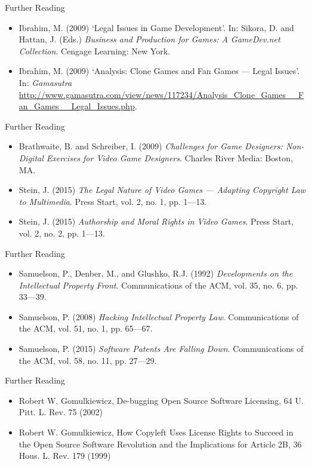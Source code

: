 \documentclass[xcolor={dvipsnames}]{beamer}\usepackage{etoolbox}\newtoggle{printable}\togglefalse{printable}
\begin{document}
\begin{frame}{Further Reading}
	\begin{itemize}
		\item Ibrahim, M. (2009) `Legal Issues in Game Development'. In: Sikora, D. and Hattan, J. (Eds.) \textit{Business and Production for Games: A GameDev.net Collection}.
		Cengage Learning: New York.
		\vspace{2ex}
		\item Ibrahim, M. (2009) `Analysis: Clone Games and Fan Games --- Legal Issues'. In: \textit{Gamasutra}
		\url{http://www.gamasutra.com/view/news/117234/Analysis_Clone_Games__Fan_Games__Legal_Issues.php}.
	\end{itemize}
\end{frame}

\begin{frame}{Further Reading}
	\begin{itemize}
		\item Brathwaite, B. and Schreiber, I. (2009) \textit{Challenges for Game Designers: Non-Digital Exercises for Video Game Designers}. Charles
		River Media: Boston, MA.
		\vspace{2ex}
		\item Stein, J. (2015) \textit{The Legal Nature of Video Games --- Adapting Copyright Law to Multimedia}. Press Start, vol. 2, no. 1, pp. 1---13.
		\vspace{2ex}
		\item Stein, J. (2015) \textit{Authorship and Moral Rights in Video Games}. Press Start, vol. 2, no. 2, pp. 1---13.
	\end{itemize}
\end{frame}

\begin{frame}{Further Reading}
	\begin{itemize}
		\item Samuelson, P., Denber, M., and Glushko, R.J. (1992) \textit{Developments on the Intellectual Property Front}. Communications of the ACM, vol. 35, no. 6, pp. 33---39.
		\item Samuelson, P. (2008) \textit{Hacking Intellectual Property Law}. Communications of the ACM, vol. 51, no. 1, pp. 65---67.
		\item Samuelson, P. (2015) \textit{Software Patents Are Falling Down}. Communications of the ACM, vol. 58, no. 11, pp. 27---29.
	\end{itemize}
\end{frame}

\begin{frame}{Further Reading}
	\begin{itemize}
		\item Robert W. Gomulkiewicz, De-bugging Open Source Software Licensing, 64 U. Pitt. L. Rev. 75 (2002)
		\vspace{2ex}
		\item Robert W. Gomulkiewicz, How Copyleft Uses License Rights to Succeed in the Open Source Software Revolution and the Implications for Article 2B, 36 Hous. L. Rev. 179 (1999)
	\end{itemize}
\end{frame}
\end{document}
